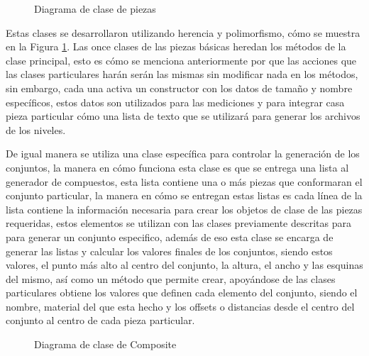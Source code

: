 \begin{figure}
  \centering
  \scalebox{.43}{}
  \caption{Diagrama de clase de piezas}
  \label{figure:pieces-class-diagram}
\end{figure}

Estas clases se desarrollaron utilizando herencia y polimorfismo, cómo se
muestra en la Figura \ref{figure:pieces-class-diagram}. Las once clases de las
piezas básicas heredan los métodos de la clase principal, esto es cómo se
menciona anteriormente por que las acciones que las clases particulares harán
serán las mismas sin modificar nada en los métodos, sin embargo, cada una activa
un constructor con los datos de tamaño y nombre específicos, estos datos son
utilizados para las mediciones y para integrar casa pieza particular cómo una
lista de texto que se utilizará para generar los archivos de los niveles.

De igual manera se utiliza una clase específica para controlar la generación de
los conjuntos, la manera en cómo funciona esta clase es que se entrega una lista
al generador de compuestos, esta lista contiene una o más piezas que conformaran
el conjunto particular, la manera en cómo se entregan estas listas es cada línea
de la lista contiene la información necesaria para crear los objetos de clase de
las piezas requeridas, estos elementos se utilizan con las clases previamente
descritas para para generar un conjunto especifico, además de eso esta clase se
encarga de generar las listas y calcular los valores finales de los conjuntos,
siendo estos valores, el punto más alto al centro del conjunto, la altura, el
ancho y las esquinas del mismo, así como un método que permite crear, apoyándose
de las clases particulares obtiene los valores que definen cada elemento del
conjunto, siendo el nombre, material del que esta hecho y los offsets o
distancias desde el centro del conjunto al centro de cada pieza particular.

\begin{figure}
  \centering
  \scalebox{.65}{}
  \caption{Diagrama de clase de Composite}
  \label{figure:composite-class-diagram}
\end{figure}

